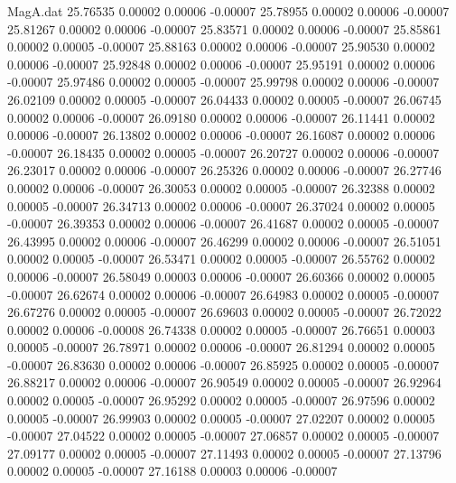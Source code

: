 \begin{filecontents}{MagA.dat}
  25.76535    0.00002    0.00006   -0.00007
  25.78955    0.00002    0.00006   -0.00007
  25.81267    0.00002    0.00006   -0.00007
  25.83571    0.00002    0.00006   -0.00007
  25.85861    0.00002    0.00005   -0.00007
  25.88163    0.00002    0.00006   -0.00007
  25.90530    0.00002    0.00006   -0.00007
  25.92848    0.00002    0.00006   -0.00007
  25.95191    0.00002    0.00006   -0.00007
  25.97486    0.00002    0.00005   -0.00007
  25.99798    0.00002    0.00006   -0.00007
  26.02109    0.00002    0.00005   -0.00007
  26.04433    0.00002    0.00005   -0.00007
  26.06745    0.00002    0.00006   -0.00007
  26.09180    0.00002    0.00006   -0.00007
  26.11441    0.00002    0.00006   -0.00007
  26.13802    0.00002    0.00006   -0.00007
  26.16087    0.00002    0.00006   -0.00007
  26.18435    0.00002    0.00005   -0.00007
  26.20727    0.00002    0.00006   -0.00007
  26.23017    0.00002    0.00006   -0.00007
  26.25326    0.00002    0.00006   -0.00007
  26.27746    0.00002    0.00006   -0.00007
  26.30053    0.00002    0.00005   -0.00007
  26.32388    0.00002    0.00005   -0.00007
  26.34713    0.00002    0.00006   -0.00007
  26.37024    0.00002    0.00005   -0.00007
  26.39353    0.00002    0.00006   -0.00007
  26.41687    0.00002    0.00005   -0.00007
  26.43995    0.00002    0.00006   -0.00007
  26.46299    0.00002    0.00006   -0.00007
  26.51051    0.00002    0.00005   -0.00007
  26.53471    0.00002    0.00005   -0.00007
  26.55762    0.00002    0.00006   -0.00007
  26.58049    0.00003    0.00006   -0.00007
  26.60366    0.00002    0.00005   -0.00007
  26.62674    0.00002    0.00006   -0.00007
  26.64983    0.00002    0.00005   -0.00007
  26.67276    0.00002    0.00005   -0.00007
  26.69603    0.00002    0.00005   -0.00007
  26.72022    0.00002    0.00006   -0.00008
  26.74338    0.00002    0.00005   -0.00007
  26.76651    0.00003    0.00005   -0.00007
  26.78971    0.00002    0.00006   -0.00007
  26.81294    0.00002    0.00005   -0.00007
  26.83630    0.00002    0.00006   -0.00007
  26.85925    0.00002    0.00005   -0.00007
  26.88217    0.00002    0.00006   -0.00007
  26.90549    0.00002    0.00005   -0.00007
  26.92964    0.00002    0.00005   -0.00007
  26.95292    0.00002    0.00005   -0.00007
  26.97596    0.00002    0.00005   -0.00007
  26.99903    0.00002    0.00005   -0.00007
  27.02207    0.00002    0.00005   -0.00007
  27.04522    0.00002    0.00005   -0.00007
  27.06857    0.00002    0.00005   -0.00007
  27.09177    0.00002    0.00005   -0.00007
  27.11493    0.00002    0.00005   -0.00007
  27.13796    0.00002    0.00005   -0.00007
  27.16188    0.00003    0.00006   -0.00007

\end{filecontents}
